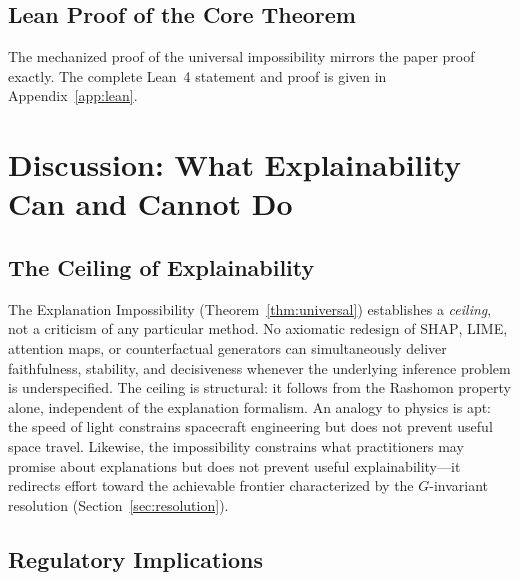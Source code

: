 \documentclass[11pt,a4paper]{article}
\newcommand{\SHAP}{\textsc{SHAP}}
\begin{document}
\subsection{Lean Proof of the Core Theorem}

The mechanized proof of the universal impossibility mirrors the paper proof
exactly.  The complete Lean~4 statement and proof is given in
Appendix~\ref{app:lean}.

\section{Discussion: What Explainability Can and Cannot Do}
\label{sec:discussion}

\subsection{The Ceiling of Explainability}
\label{sec:ceiling}

The Explanation Impossibility (Theorem~\ref{thm:universal}) establishes
a \emph{ceiling}, not a criticism of any particular method.  No axiomatic
redesign of \SHAP{}, LIME, attention maps, or counterfactual generators can
simultaneously deliver faithfulness, stability, and decisiveness whenever the
underlying inference problem is underspecified.  The ceiling is structural: it
follows from the Rashomon property alone, independent of the explanation
formalism.  An analogy to physics is apt: the speed of light constrains
spacecraft engineering but does not prevent useful space travel.  Likewise, the
impossibility constrains what practitioners may promise about explanations but
does not prevent useful explainability---it redirects effort toward the
achievable frontier characterized by the $G$-invariant resolution
(Section~\ref{sec:resolution}).

\subsection{Regulatory Implications}
\label{sec:regulatory}
\end{document}
